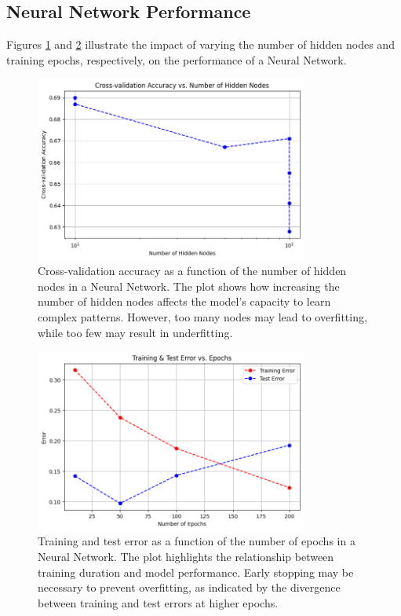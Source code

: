 \documentclass{article}
\begin{document}
\subsection{Neural Network Performance}
Figures \ref{fig:nn_nodes} and \ref{fig:nn_epochs} illustrate the impact of varying the number of hidden nodes and training epochs, respectively, on the performance of a Neural Network.

\begin{figure}[H]
    \centering
    \includegraphics[width=0.8\textwidth]{crossval_accuracy_hidden_nodes.png}
    \caption{Cross-validation accuracy as a function of the number of hidden nodes in a Neural Network. The plot shows how increasing the number of hidden nodes affects the model's capacity to learn complex patterns. However, too many nodes may lead to overfitting, while too few may result in underfitting.}
    \label{fig:nn_nodes}
\end{figure}

\begin{figure}[H]
    \centering
    \includegraphics[width=0.8\textwidth]{training_test_error_epochs.png}
    \caption{Training and test error as a function of the number of epochs in a Neural Network. The plot highlights the relationship between training duration and model performance. Early stopping may be necessary to prevent overfitting, as indicated by the divergence between training and test errors at higher epochs.}
    \label{fig:nn_epochs}
\end{figure}
\end{document}
